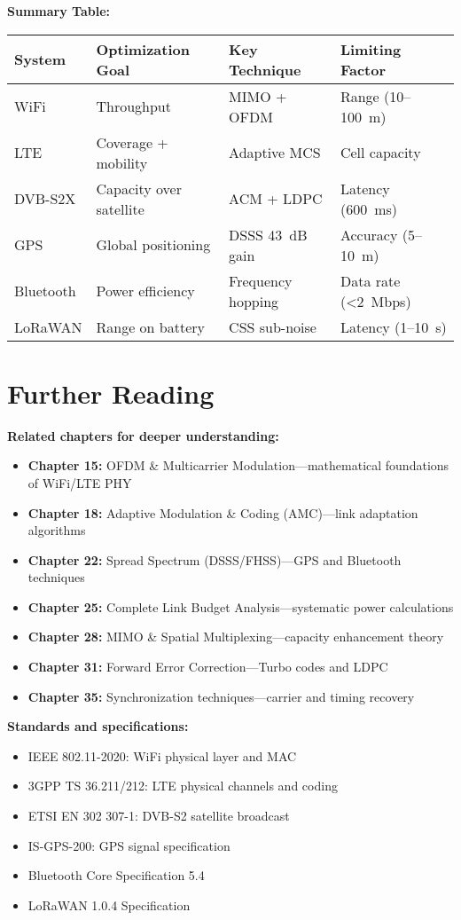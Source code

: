\textbf{Summary Table:}

\begin{center}
\begin{tabular}{@{}llll@{}}
\toprule
\textbf{System} & \textbf{Optimization Goal} & \textbf{Key Technique} & \textbf{Limiting Factor} \\
\midrule
WiFi & Throughput & MIMO + OFDM & Range (10--100~m) \\
LTE & Coverage + mobility & Adaptive MCS & Cell capacity \\
DVB-S2X & Capacity over satellite & ACM + LDPC & Latency (600~ms) \\
GPS & Global positioning & DSSS 43~dB gain & Accuracy (5--10~m) \\
Bluetooth & Power efficiency & Frequency hopping & Data rate (<2~Mbps) \\
LoRaWAN & Range on battery & CSS sub-noise & Latency (1--10~s) \\
\bottomrule
\end{tabular}
\end{center}

\section{Further Reading}

\textbf{Related chapters for deeper understanding:}

\begin{itemize}
\item \textbf{Chapter 15:} OFDM \& Multicarrier Modulation---mathematical foundations of WiFi/LTE PHY
\item \textbf{Chapter 18:} Adaptive Modulation \& Coding (AMC)---link adaptation algorithms
\item \textbf{Chapter 22:} Spread Spectrum (DSSS/FHSS)---GPS and Bluetooth techniques
\item \textbf{Chapter 25:} Complete Link Budget Analysis---systematic power calculations
\item \textbf{Chapter 28:} MIMO \& Spatial Multiplexing---capacity enhancement theory
\item \textbf{Chapter 31:} Forward Error Correction---Turbo codes and LDPC
\item \textbf{Chapter 35:} Synchronization techniques---carrier and timing recovery
\end{itemize}

\textbf{Standards and specifications:}

\begin{itemize}
\item IEEE 802.11-2020: WiFi physical layer and MAC
\item 3GPP TS 36.211/212: LTE physical channels and coding
\item ETSI EN 302 307-1: DVB-S2 satellite broadcast
\item IS-GPS-200: GPS signal specification
\item Bluetooth Core Specification 5.4
\item LoRaWAN 1.0.4 Specification
\end{itemize}
